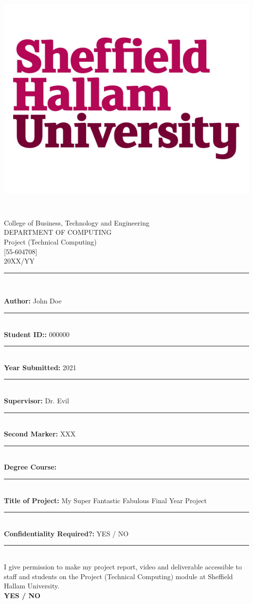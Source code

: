 \documentclass[11pt, a4paper]{report}
\begin{document}
	

\begin{titlepage}
\newcommand{\HRule}{\rule{\linewidth}{0.1mm}}
\begin{minipage}{0.3\textwidth}
\begin{flushleft} \large
\includegraphics[scale=0.18]{img/shu-logo.jpg}
\end{flushleft}
\end{minipage}
~

\center
{\huge College of Business, Technology and Engineering}\\[0.1cm]
\LARGE
DEPARTMENT OF COMPUTING\\[0.1cm]
Project (Technical Computing) \\[0.1cm]
[55-604708]\\[0.1cm]
20XX/YY\\[0.1cm]
\HRule \\[0.1cm]
\begin{flushleft}
\Large {\bf Author:} John Doe
\HRule \\[0.1cm]
\Large {\bf Student ID::} 000000
\HRule \\[0.1cm]
\Large {\bf Year Submitted:} 2021
\HRule \\[0.1cm]
\Large {\bf Supervisor:} Dr. Evil
\HRule \\[0.1cm]
\Large {\bf Second Marker:} XXX
\HRule \\[0.1cm]
{\Large {\bf Degree Course:}}
\HRule \\[0.1cm]
{ \Large {\bf Title of Project:} My Super Fantastic Fabulous Final Year Project}
\HRule \\[0.1cm]
{\Large {\bf Confidentiality Required?:} YES / NO}
\HRule
\\
I give permission to make my project report, video and deliverable accessible to staff and students on the Project (Technical Computing) module at Sheffield Hallam University.\\
\textbf{YES / NO}
\end{flushleft}
\end{titlepage}
\end{document}

